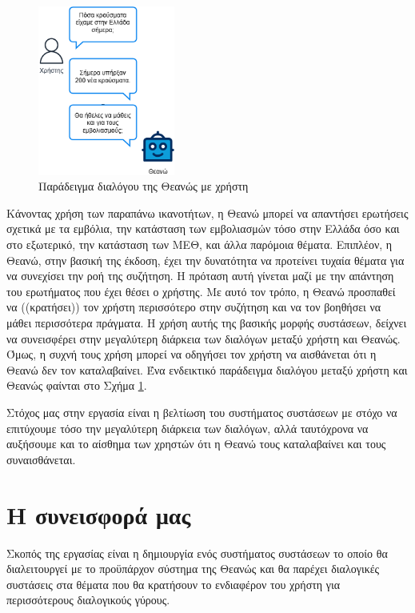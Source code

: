 \begin{figure}
    \centering
    \includegraphics[width=0.4\textwidth]{body_matter/introduction/images/theano_example.png}
    \caption{Παράδειγμα διαλόγου της Θεανώς με χρήστη}
    \label{fig:theano_dialogue}
\end{figure}

Κάνοντας χρήση των παραπάνω ικανοτήτων, η Θεανώ μπορεί να απαντήσει ερωτήσεις σχετικά με τα εμβόλια, την κατάσταση των εμβολιασμών
τόσο στην Ελλάδα όσο και στο εξωτερικό, την κατάσταση των ΜΕΘ, και άλλα παρόμοια θέματα. Επιπλέον, η Θεανώ, στην βασική της έκδοση,
έχει την δυνατότητα να προτείνει τυχαία θέματα για να συνεχίσει την ροή της συζήτηση. Η πρόταση αυτή γίνεται μαζί με την απάντηση του
ερωτήματος που έχει θέσει ο χρήστης. Με αυτό τον τρόπο, η Θεανώ προσπαθεί να ((κρατήσει)) τον χρήστη περισσότερο στην συζήτηση και να τον βοηθήσει
να μάθει περισσότερα πράγματα. Η χρήση αυτής της βασικής μορφής συστάσεων, δείχνει να συνεισφέρει στην μεγαλύτερη διάρκεια των διαλόγων μεταξύ
χρήστη και Θεανώς. Όμως, η συχνή τους χρήση μπορεί να οδηγήσει τον χρήστη να αισθάνεται ότι η Θεανώ δεν τον καταλαβαίνει. Ένα ενδεικτικό παράδειγμα διαλόγου μεταξύ χρήστη
και Θεανώς φαίνται στο Σχήμα \ref{fig:theano_dialogue}.

Στόχος μας στην εργασία είναι η βελτίωση του συστήματος συστάσεων με στόχο να επιτύχουμε τόσο την μεγαλύτερη διάρκεια των διαλόγων, αλλά ταυτόχρονα
να αυξήσουμε και το αίσθημα των χρηστών ότι η Θεανώ τους καταλαβαίνει και τους συναισθάνεται.

\section{Η συνεισφορά μας}

Σκοπός της εργασίας είναι η δημιουργία ενός συστήματος συστάσεων το οποίο θα διαλειτουργεί με το προϋπάρχον σύστημα της Θεανώς και θα παρέχει διαλογικές
συστάσεις στα θέματα που θα κρατήσουν το ενδιαφέρον του χρήστη για περισσότερους διαλογικούς γύρους.

